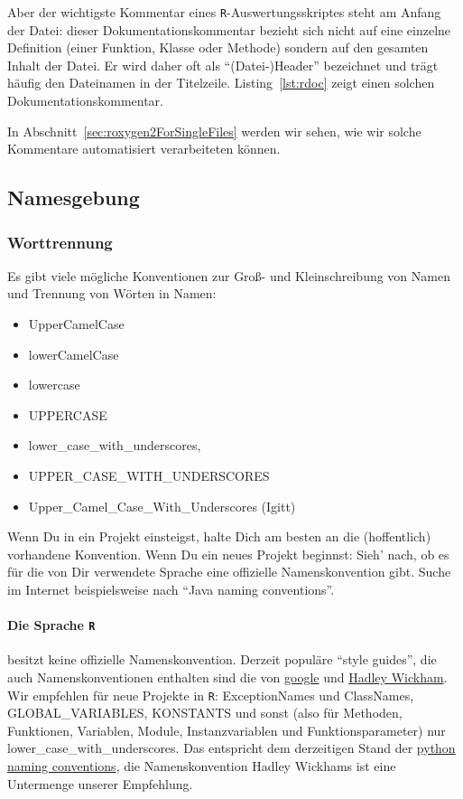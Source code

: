 \documentclass[twoside]{scrartcl}
\providecommand{\R}{\texttt{R}}
\begin{document}
Aber der wichtigste Kommentar eines \R{}-Auswertungsskriptes steht  
am Anfang der Datei: dieser Dokumentationskommentar bezieht sich nicht auf eine
einzelne Definition (einer Funktion, Klasse oder Methode) sondern auf den 
gesamten Inhalt der
Datei. Er wird daher oft als "`(Datei-)Header"' bezeichnet und tr\"a{}gt
h\"a{}ufig den Dateinamen in der Titelzeile.
Listing~\ref{lst:rdoc} zeigt einen solchen Dokumentationskommentar. 

 
In Abschnitt~\ref{sec:roxygen2ForSingleFiles} werden wir sehen, wie wir solche
Kommentare automatisiert verarbeiteten k\"o{}nnen.


\subsection{Namesgebung\label{sec:naming}}
\subsubsection{Worttrennung}
Es gibt viele m\"o{}gliche Konventionen zur Gro\ss{}- und Kleinschreibung  von
Namen und
Trennung von W\"o{}rten in Namen:
\begin{itemize}
\item UpperCamelCase
\item lowerCamelCase
\item lowercase
\item UPPERCASE
\item lower\_case\_with\_underscores,
\item UPPER\_CASE\_WITH\_UNDERSCORES
\item Upper\_Camel\_Case\_With\_Underscores (Igitt)
\end{itemize}
Wenn Du in ein Projekt einsteigst, halte Dich am besten an die (hoffentlich)
vorhandene Konvention.
Wenn Du ein neues Projekt beginnst: Sieh' nach, ob es f\"u{}r die von Dir 
verwendete Sprache eine offizielle Namenskonvention gibt. Suche im Internet 
beispielsweise nach "`Java naming conventions"'.

\paragraph{Die Sprache \R{}} besitzt keine offizielle
Namenskonvention. Derzeit
popul\"a{}re "`style guides"', die auch Namenskonventionen enthalten sind die
von
\href{https://google-styleguide.googlecode.com/svn/trunk/Rguide.xml}{google} und
\href{http://adv-r.had.co.nz/Style.html}{Hadley Wickham}.
Wir empfehlen f\"u{}r neue Projekte in \R{}: 
ExceptionNames und ClassNames, GLOBAL\_VARIABLES, KONSTANTS und sonst (also
f\"u{}r Methoden, Funktionen, Variablen, Module, Instanzvariablen und
Funktionsparameter) nur 
lower\_case\_with\_underscores.
Das entspricht dem derzeitigen Stand der
\href{http://legacy.python.org/dev/peps/pep-0008/#naming-conventions}{python
  naming conventions}, die Namenskonvention Hadley Wickhams ist eine
  Untermenge unserer Empfehlung.
\end{document}
